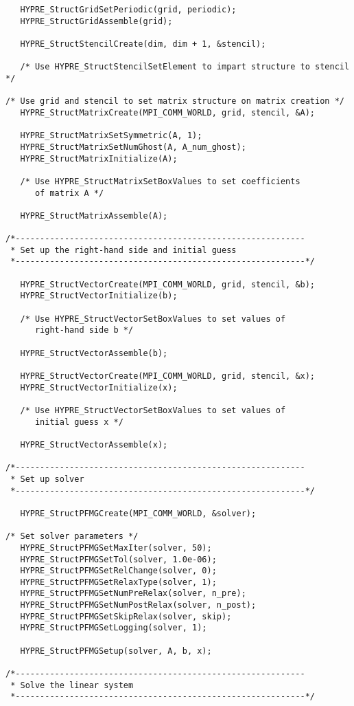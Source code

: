 \begin{itemize}
\begin{display}
\begin{verbatim}
   HYPRE_StructGridSetPeriodic(grid, periodic);
   HYPRE_StructGridAssemble(grid);
	
   HYPRE_StructStencilCreate(dim, dim + 1, &stencil);

   /* Use HYPRE_StructStencilSetElement to impart structure to stencil */

/* Use grid and stencil to set matrix structure on matrix creation */
   HYPRE_StructMatrixCreate(MPI_COMM_WORLD, grid, stencil, &A);

   HYPRE_StructMatrixSetSymmetric(A, 1);
   HYPRE_StructMatrixSetNumGhost(A, A_num_ghost);
   HYPRE_StructMatrixInitialize(A);

   /* Use HYPRE_StructMatrixSetBoxValues to set coefficients
      of matrix A */

   HYPRE_StructMatrixAssemble(A);

/*-----------------------------------------------------------
 * Set up the right-hand side and initial guess
 *-----------------------------------------------------------*/

   HYPRE_StructVectorCreate(MPI_COMM_WORLD, grid, stencil, &b);
   HYPRE_StructVectorInitialize(b);

   /* Use HYPRE_StructVectorSetBoxValues to set values of
      right-hand side b */

   HYPRE_StructVectorAssemble(b);

   HYPRE_StructVectorCreate(MPI_COMM_WORLD, grid, stencil, &x);
   HYPRE_StructVectorInitialize(x);

   /* Use HYPRE_StructVectorSetBoxValues to set values of
      initial guess x */

   HYPRE_StructVectorAssemble(x);

/*-----------------------------------------------------------
 * Set up solver
 *-----------------------------------------------------------*/

   HYPRE_StructPFMGCreate(MPI_COMM_WORLD, &solver);

/* Set solver parameters */
   HYPRE_StructPFMGSetMaxIter(solver, 50);
   HYPRE_StructPFMGSetTol(solver, 1.0e-06);
   HYPRE_StructPFMGSetRelChange(solver, 0);
   HYPRE_StructPFMGSetRelaxType(solver, 1);
   HYPRE_StructPFMGSetNumPreRelax(solver, n_pre);
   HYPRE_StructPFMGSetNumPostRelax(solver, n_post);
   HYPRE_StructPFMGSetSkipRelax(solver, skip);
   HYPRE_StructPFMGSetLogging(solver, 1);

   HYPRE_StructPFMGSetup(solver, A, b, x);

/*-----------------------------------------------------------
 * Solve the linear system
 *-----------------------------------------------------------*/


\end{verbatim}
\end{display}
\end{itemize}
